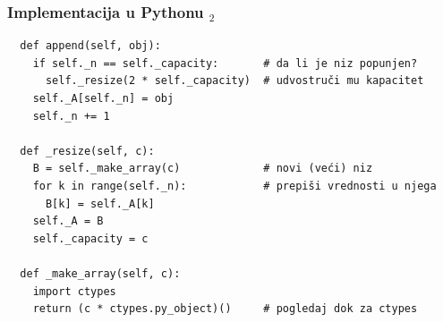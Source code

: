 \documentclass[compress,aspectratio=169]{beamer}
\begin{document}
\begin{frame}[fragile,shrink=15]
  \frametitle{Implementacija u Pythonu $_2$}
\begin{verbatim}
  def append(self, obj):
    if self._n == self._capacity:       # da li je niz popunjen?
      self._resize(2 * self._capacity)  # udvostruči mu kapacitet
    self._A[self._n] = obj
    self._n += 1
    
  def _resize(self, c):
    B = self._make_array(c)             # novi (veći) niz
    for k in range(self._n):            # prepiši vrednosti u njega
      B[k] = self._A[k]
    self._A = B
    self._capacity = c
    
  def _make_array(self, c):
    import ctypes
    return (c * ctypes.py_object)()     # pogledaj dok za ctypes
\end{verbatim}
\end{frame}
\end{document}
